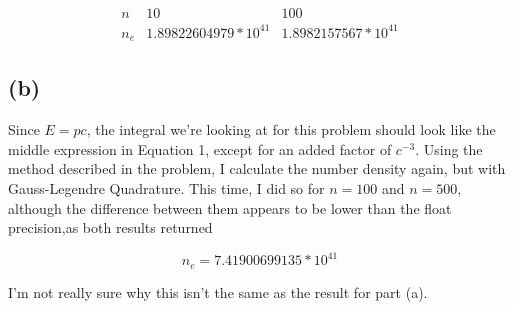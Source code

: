 \documentclass[11pt,letterpaper]{article}
\begin{document}
\[
\begin{array}{ccc}
n & 10 & 100 \\
n_e & 1.89822604979*10^{41} & 1.8982157567*10^{41}
\end{array}
\]

\subsection*{(b)}

Since $E = pc$, the integral we're looking at for this problem should look like the middle expression in Equation 1, except for an added factor of $c^{-3}$. Using the method described in the problem, I calculate the number density again, but with Gauss-Legendre Quadrature. This time, I did so for $n=100$ and $n=500$, although the difference between them appears to be lower than the float precision,as both results returned

$$ n_e = 7.41900699135*10^{41} $$

I'm not really sure why this isn't the same as the result for part (a). 
\end{document}
